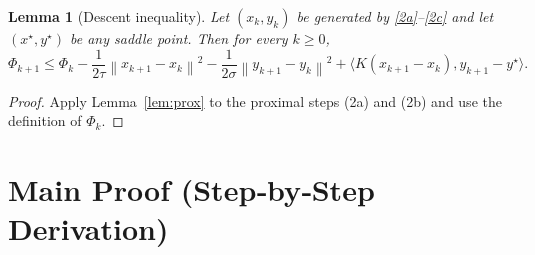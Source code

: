\documentclass{article}
\newtheorem{lemma}{Lemma}
\newcommand{\ip}[2]{\langle #1,#2\rangle}
\newcommand{\norm}[1]{\left\|#1\right\|}
\begin{document}
\begin{lemma}[Descent inequality]\label{lem:descent}
Let $(x_{k},y_{k})$ be generated by \eqref{2a}–\eqref{2c} and let $(x^{\star},y^{\star})$ be any saddle point. Then for every $k\ge0$,
\[
\Phi_{k+1}\le\Phi_{k}
        -\frac{1}{2\tau}\norm{x_{k+1}-x_{k}}^{2}
        -\frac{1}{2\sigma}\norm{y_{k+1}-y_{k}}^{2}
        +\ip{K(x_{k+1}-x_{k})}{y_{k+1}-y^{\star}}.
\tag{12}
\]
\end{lemma}
\begin{proof}
Apply Lemma~\ref{lem:prox} to the proximal steps (2a) and (2b) and use the definition of $\Phi_{k}$.
\end{proof}

\section*{Main Proof (Step‑by‑Step Derivation)}
\end{document}
